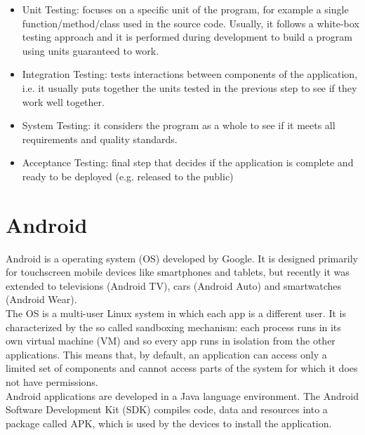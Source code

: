 \documentclass[11pt,a4paper,notitlepage]{article}
\begin{document}
\begin{itemize}
	\item Unit Testing: focuses on a specific unit of the program, for example a single function/method/class used in the source code. Usually, it follows a white-box testing approach and it is performed during development to build a program using units guaranteed to work.
	\item Integration Testing: tests interactions between components of the application, i.e. it usually puts together the units tested in the previous step to see if they work well together.
	\item System Testing: it considers the program as a whole to see if it meets all requirements and quality standards.
	\item Acceptance Testing: final step that decides if the application is complete and ready to be deployed (e.g. released to the public)
\end{itemize}

\section{Android}
Android is a operating system (OS) developed by Google. It is designed primarily for touchscreen mobile devices like smartphones and tablets, but recently it was extended to televisions (Android TV), cars (Android Auto) and smartwatches (Android Wear).\medskip \\
The OS is a multi-user Linux system in which each app is a different user. It is characterized by the so called sandboxing mechanism: each process runs in its own virtual machine (VM) and so every app runs in isolation from the other applications. This means that, by default, an application can access only a limited set of components and cannot access parts of the system for which it does not have permissions.\medskip \\
Android applications are developed in a Java language environment. The Android Software Development Kit (SDK) compiles code, data and resources into a package called APK, which is used by the devices to install the application.
\end{document}
